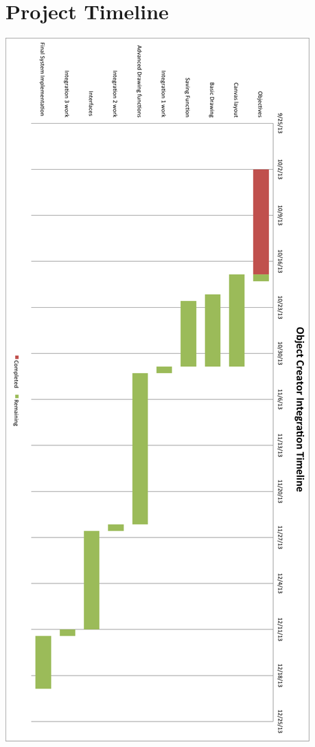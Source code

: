 \documentclass[a4paper, 11pt]{article} %
\begin{document}

\section*{Project Timeline}

\includegraphics[scale=0.35]{Timeline}\\
\end{document}
